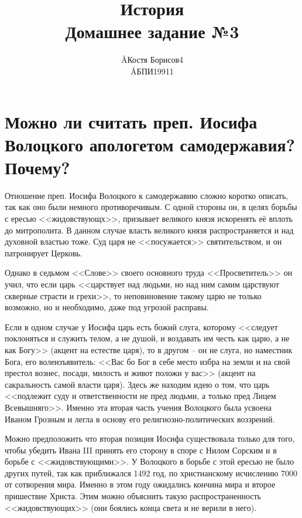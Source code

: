 \documentclass[12pt]{article}
\title{История \\ Домашнее задание №3}
\author{\AA{Костя Борисов}{4} \\ \AA{БПИ199}{11}}
\begin{document}
  \maketitle
  \setcounter{section}{2}

  \section{Можно ли считать преп. Иосифа Волоцкого апологетом\protect\footnotemark{} самодержавия\protect\footnotemark{}? Почему?}
  \addtocounter{footnote}{-2}

  Отношение преп. Иосифа Волоцкого к самодержавию сложно коротко описать, так как оно были немного противоречивым.
  С одной стороны он, в целях борьбы с ересью <<жидовствующх>>, призывает великого князя искоренять её вплоть до митрополита.
  В данном случае власть великого князя распространяется и над духовной властью тоже.
  Суд царя не <<посужается>> святительством, и он патронирует Церковь.

  Однако в седьмом <<Слове>> своего основного труда <<Просветитель>> он учил,
  что если царь <<царствует над людьми, но над ним самим царствуют скверные страсти и грехи>>,
  то неповиновение такому царю не только возможно, но и необходимо, даже под угрозой расправы.

  Если в одном случае у Иосифа царь есть божий слуга,
  которому <<следует поклоняться и служить телом, а не душой, и воздавать им честь как царю, а не как Богу>> (акцент на естестве царя),
  то в другом -- он не слуга, но наместник Бога, его волеизъявитель:
  <<Вас бо Бог в себе место избра на земли и на свой престол вознес, посади, милость и живот положи у вас>>
  (акцент на сакральность самой власти царя).
  Здесь же находим идею о том, что царь <<подлежит суду и ответственности не пред людьми, а только пред Лицем Всевышняго>>.
  Именно эта вторая часть учения Волоцкого была усвоена Иваном Грозным и легла в основу его религиозно-политических воззрений.

  Можно предположить что вторая позиция Иосифа существовала только для того,
  чтобы убедить Ивана III принять его сторону в споре с Нилом Сорским и в борьбе с <<жидовствующими>>.
  У Волоцкого в борьбе с этой ересью не было других путей, так как приближался 1492 год, по христианскому исчислению 7000 от сотворения мира.
  Именно в этом году ожидались кончина мира и второе пришествие Христа.
  Этим можно объяснить такую распространенность <<жидовствующих>> (они боялись конца света и не верили в него).
\end{document}
